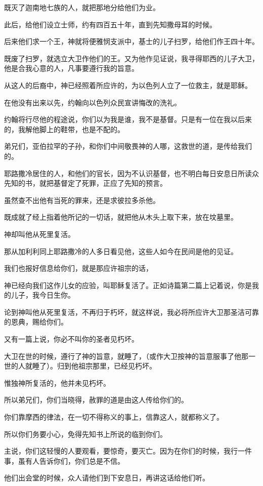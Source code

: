 \documentclass[12pt,oneside]{book}
\begin{document}
既灭了迦南地七族的人，就把那地分给他们为业。

此后，给他们设立士师，约有四百五十年，直到先知撒母耳的时候。

后来他们求一个王，神就将便雅悯支派中，基士的儿子扫罗，给他们作王四十年。

既废了扫罗，就选立大卫作他们的王。又为他作见证说，我寻得耶西的儿子大卫，他是合我心意的人，凡事要遵行我的旨意。

从这人的后裔中，神已经照着所应许的，为以色列人立了一位救主，就是耶稣。

在他没有出来以先，约翰向以色列众民宣讲悔改的洗礼。

约翰将行尽他的程途说，你们以为我是谁，我不是基督。只是有一位在我以后来的，我解他脚上的鞋带，也是不配的。

弟兄们，亚伯拉罕的子孙，和你们中间敬畏神的人哪，这救世的道，是传给我们的。

耶路撒冷居住的人，和他们的官长，因为不认识基督，也不明白每日安息日所读众先知的书，就把基督定了死罪，正应了先知的预言。

虽然查不出他有当死的罪来，还是求彼拉多杀他。

既成就了经上指着他所记的一切话，就把他从木头上取下来，放在坟墓里。

神却叫他从死里复活。

那从加利利同上耶路撒冷的人多日看见他，这些人如今在民间是他的见证。

我们也报好信息给你们，就是那应许祖宗的话，

神已经向我们这作儿女的应验，叫耶稣复活了。正如诗篇第二篇上记着说，你是我的儿子，我今日生你。

论到神叫他从死里复活，不再归于朽坏，就这样说，我必将所应许大卫那圣洁可靠的恩典，赐给你们。

又有一篇上说，你必不叫你的圣者见朽坏。

大卫在世的时候，遵行了神的旨意，就睡了，（或作大卫按神的旨意服事了他那一世的人就睡了）。归到他祖宗那里，已经见朽坏。

惟独神所复活的，他并未见朽坏。

所以弟兄们，你们当晓得，赦罪的道是由这人传给你们的。

你们靠摩西的律法，在一切不得称义的事上，信靠这人，就都称义了。

所以你们务要小心，免得先知书上所说的临到你们。

主说，你们这轻慢的人要观看，要惊奇，要灭亡。因为在你们的时候，我行一件事，虽有人告诉你们，你们总是不信。

他们出会堂的时候，众人请他们到下安息日，再讲这话给他们听。
\end{document}
